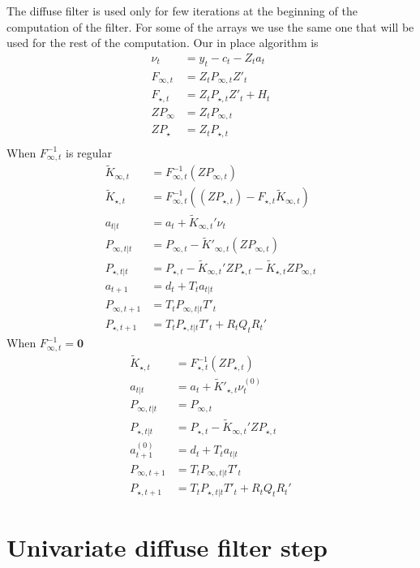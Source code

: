 \documentclass{article}
\begin{document}
The diffuse filter is used only for few iterations at the beginning of
the computation of the filter. For some of the arrays we use the same
one that will be used for the rest of the computation. Our in place
algorithm is
\begin{align*}
  \nu_t &= y_t - c_t - Z_t a_t \\
  F_{\infty,t} &= Z_tP_{\infty,t}Z'_t \\
  F_{\star,t} &= Z_tP_{\star,t}Z'_t + H_t \\
  ZP_\infty &= Z_tP_{\infty,t}\\
  ZP_\star &= Z_tP_{\star,t} \\
\end{align*}
When $F^{-1}_{\infty,t}$ is regular
\begin{align*}
  \tilde K_{\infty,t} &= F^{-1}_{\infty,t}(ZP_{\infty,t}) \\
  \tilde K_{\star,t} &=  F^{-1}_{\infty,t}((ZP_{\star,t}) -
                       F_{\star,t}\tilde K_{\infty,t}) \\
  a_{t|t} &= a_t + \tilde K_{\infty,t}'\nu_t\\
  P_{\infty,t|t} &= P_{\infty,t} - \tilde K'_{\infty,t}(ZP_{\infty,t}) \\
  P_{\star,t|t} &= P_{\star,t} - \tilde K_{\infty,t}'ZP_{\star,t}
                  - \tilde K_{\star,t}ZP_{\infty,t}\\
  a_{t+1} &= d_t + T_ta_{t|t} \\
  P_{\infty,t+ 1} &= T_tP_{\infty,t|t}T'_t\\
  P_{\star, t+1} &= T_tP_{\star,t|t}T'_t + R_tQ_tR_t'
\end{align*}
When $F^{-1}_{\infty,t} = \mathbf{0}$
\begin{align*}
  \tilde K_{\star,t} &= F^{-1}_{\star,t}(ZP_{\star,t})\\
  a_{t|t} &= a_t + \tilde K'_{\star,t}\nu^{(0)}_t\\
  P_{\infty,t|t} &= P_{\infty,t} \\
  P_{\star,t|t} &= P_{\star,t} - \tilde K_{\infty,t}'ZP_{\star,t}\\
  a^{(0)}_{t+1} &= d_t + T_ta_{t|t}\\
  P_{\infty,t+ 1} &= T_tP_{\infty,t|t}T'_t \\
  P_{\star, t+1} &= T_tP_{\star,t|t}T'_t + R_tQ_tR_t' 
\end{align*}

\section{Univariate diffuse filter step}
\end{document}
